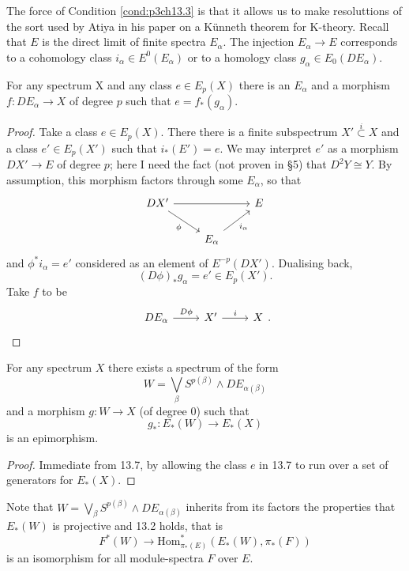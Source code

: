 \documentclass[../main]{subfiles}
\begin{document}
The force of Condition \ref{cond:p3ch13.3} is that it allows us to make resoluttions of the sort used by Atiya in his paper on a K\"{u}nneth theorem for K-theory. Recall that $E$ is the direct limit of finite spectra $E_\alpha$. The injection $E_\alpha \longrightarrow E$ corresponds to a cohomology class $i_\alpha \in E^0(E_\alpha)$ or to a homology class $g_\alpha \in E_0(DE_\alpha)$.
\begin{lemma}\label{lem:p3ch13.7}
For any spectrum X and any class $e \in E_p(X)$ there is an $E_\alpha$ and a morphism $f \colon DE_\alpha \longrightarrow X$ of degree $p$ such that $e = f_\ast(g_\alpha)$.
\end{lemma}
\begin{proof}
Take a class $e \in E_p(X)$. There there is a finite subspectrum $X' \overset{i}{\subset} X$ and a class $e' \in E_p(X')$ such that $i_\ast(E') = e$. We may interpret $e'$ as a morphism $DX' \longrightarrow E$ of degree $p$; here I need the fact (not proven in \S5) that $D^2Y \cong Y$. By assumption, this morphism factors through some $E_\alpha$, so that 
\[\begin{tikzcd}
	{DX'} && E \\
	& {E_\alpha}
	\arrow["\phi"', from=1-1, to=2-2]
	\arrow["{i_\alpha}"', from=2-2, to=1-3]
	\arrow[from=1-1, to=1-3]
\end{tikzcd}\]
and $\phi^\ast i_\alpha = e'$ considered as an element of $E^{-p}(DX')$. Dualising back,
\[(D\phi)_\ast g_\alpha = e' \in E_p(X').\]
Take $f$ to be 
\[\begin{tikzcd} 
DE_\alpha & X' & {X} \arrow["D\phi", from=1-1, to=1-2]\arrow["i", from=1-2, to=1-3]
\end{tikzcd}.\]
\end{proof}
\begin{lemma}\label{lem:p3ch13.8}
For any spectrum $X$ there exists a spectrum of the form
\[W = \bigvee_{\beta}S^{p(\beta)}\wedge DE_{\alpha(\beta)}\]
and a morphism $g \colon W \longrightarrow X$ (of degree 0) such that
\[g_\ast \colon E_\ast(W) \longrightarrow E_\ast(X)\]
is an epimorphism.\end{lemma}
\begin{proof} Immediate from 13.7, by allowing the class $e$ in 13.7 to run over a set of generators for $E_\ast(X)$.\end{proof}

Note that $W=\bigvee_{\beta}S^{p(\beta)}\wedge DE_{\alpha(\beta)}$ inherits from its factors the properties that $E_\ast(W)$ is projective and 13.2 holds, that is
\[F^\ast(W) \longrightarrow \text{Hom}^\ast_{\pi_\ast(E)}(E_\ast(W), \pi_\ast(F))\]
is an isomorphism for all module-spectra $F$ over $E$.
\end{document}
